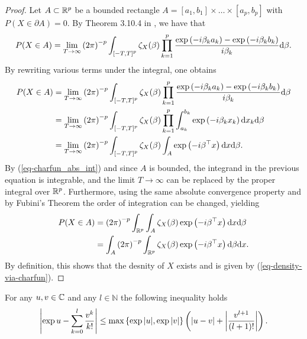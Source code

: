 \begin{proof}
    Let $A \subset \mathbb{R}^p$ be a bounded rectangle $A = [a_1, b_1] \times \ldots \times [a_p, b_p]$ with $P(X \in \partial A) = 0$. By Theorem 3.10.4 in \cite{durrett_2019}, we have that
    \begin{equation*}
        P(X \in A) = \lim_{T \rightarrow \infty} \left(2\pi\right)^{-p}\int_{\left[-T, T\right]^p} \zeta_X(\beta) \prod_{k=1}^p \frac{\exp\left(-i\beta_k a_k\right) - \exp\left(-i\beta_k b_k\right)}{i \beta_k} \text{d}\beta.
    \end{equation*}
    By rewriting various terms under the integral, one obtains
    \begin{align*}
        P(X \in A) 
        &= \lim_{T \rightarrow \infty} \left(2\pi\right)^{-p}\int_{\left[-T, T\right]^p} \zeta_X(\beta) \prod_{k=1}^p \frac{\exp\left(-i\beta_k a_k\right) - \exp\left(-i\beta_k b_k\right)}{i \beta_k} \text{d}\beta \\
        &= \lim_{T \rightarrow \infty} \left(2\pi\right)^{-p}\int_{\left[-T, T\right]^p} \zeta_X(\beta) \prod_{k=1}^p \int_{a_k}^{b_k}\exp\left(-i \beta_k x_k\right) \text{d} x_k \text{d}\beta \\
        &= \lim_{T \rightarrow \infty} \left(2\pi\right)^{-p}\int_{\left[-T, T\right]^p} \zeta_X(\beta) \int_A \exp\left(-i \beta^\top x\right) \text{d} x \text{d}\beta.
    \end{align*}
    By (\ref{eq-charfun_abs_int}) and since $A$ is bounded, the integrand in the previous equation is integrable, and the limit $T \rightarrow \infty$ can be replaced by the proper integral over $\mathbb{R}^p$. Furthermore, using the same absolute convergence property and by Fubini's Theorem the order of integration can be changed, yielding
    \begin{align*}
        P(X \in A) 
        &= \left(2\pi\right)^{-p}\int_{\mathbb{R}^p} \int_A \zeta_X(\beta) \exp\left(-i \beta^\top x\right) \text{d} x \text{d} \beta \\
        &= \int_A \left(2\pi\right)^{-p} \int_{\mathbb{R}^p} \zeta_X(\beta) \exp\left(-i \beta^\top x\right)  \text{d} \beta \text{d} x.
    \end{align*}
    By definition, this shows that the desnity of $X$ exists and is given by (\ref{eq-density-via-charfun}).
\end{proof}

\begin{lemma} \label{lemma-series}
    For any $u, v \in \mathbb{C}$ and any $l \in \mathbb{N}$ the following inequality holds
    \begin{equation}
        \left|\exp{u} - \sum_{k=0}^l \frac{v^k}{k!}\right| \leq \max \left\{ \exp{|u|}, \exp{|v|} \right\}\left(\left|u - v\right| + \left|\frac{v^{l+1}}{(l+1)!}\right|\right).
    \end{equation}
\end{lemma}

